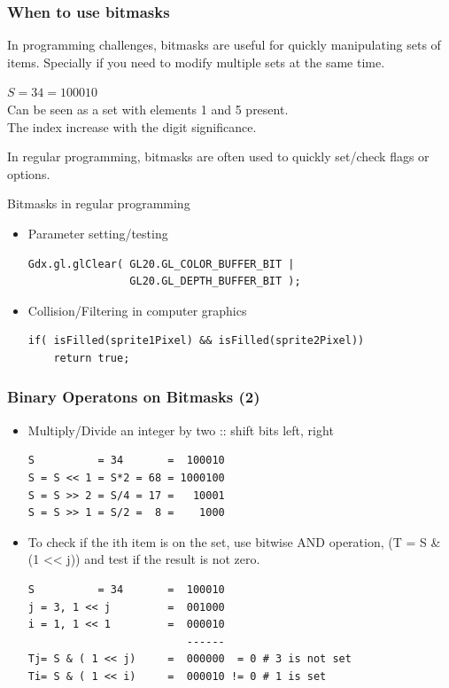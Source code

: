 \documentclass{beamer}
\begin{document}
\begin{frame}[fragile]
  \frametitle{When to use bitmasks} 
  
  {\smaller In programming challenges, bitmasks are useful for quickly
    manipulating sets of items. Specially if you need to modify
    multiple sets at the same time.  

    \begin{block}{}
      $S = 34 = 100010$\\
      \medskip
      Can be seen as a set with elements 1 and 5 present.\\ 
      The index increase with the digit significance.
    \end{block}
    
    \bigskip

    In regular programming, bitmasks are often used to quickly
    set/check flags or options.
    
    \begin{block}{Bitmasks in regular programming}
      \begin{itemize}
      \item Parameter setting/testing
\begin{verbatim}
Gdx.gl.glClear( GL20.GL_COLOR_BUFFER_BIT | 
                GL20.GL_DEPTH_BUFFER_BIT );
\end{verbatim}
      \item Collision/Filtering in computer graphics
\begin{verbatim}
if( isFilled(sprite1Pixel) && isFilled(sprite2Pixel))
    return true;
\end{verbatim}
      \end{itemize}
    \end{block}
  }
\end{frame}

\begin{frame}[fragile]
  \frametitle{Binary Operatons on Bitmasks (2)}
{\smaller

  \begin{itemize}
  \item Multiply/Divide an integer by two :: shift bits left, right
\begin{verbatim}
S          = 34       =  100010
S = S << 1 = S*2 = 68 = 1000100
S = S >> 2 = S/4 = 17 =   10001
S = S >> 1 = S/2 =  8 =    1000
\end{verbatim}
\item To check if the ith item is on the set, use bitwise AND
  operation, (T = S \& (1 << j)) and test if the result is not zero.
\begin{verbatim}
S          = 34       =  100010
j = 3, 1 << j         =  001000
i = 1, 1 << 1         =  000010
                         ------
Tj= S & ( 1 << j)     =  000000  = 0 # 3 is not set
Ti= S & ( 1 << i)     =  000010 != 0 # 1 is set
\end{verbatim}

  \end{itemize}

}
\end{frame}
\end{document}

